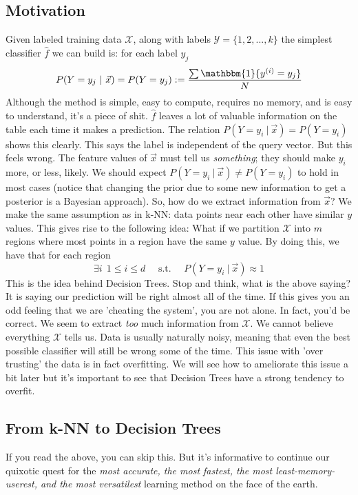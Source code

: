\documentclass[10pt]{article}
\begin{document}
	\subsection*{Motivation}
		Given labeled training data $\mathcal{X}$, along with labels $\mathcal{Y} = \{1, 2, ... , k\} $ 
		the simplest classifier $\hat f$ we can build is: for each label $y_j$  
		$$P(Y=y_j \ | \ \vec x) = P(Y=y_j) :=  \frac{ \sum\mathbbm{1} \{y^{(i)} = y_j \} }{N}  $$ 
		Although the method is simple, easy to compute, requires no memory, and is easy to understand, it's a piece of shit. 
		$\hat f$ leaves  a lot of valuable information on the table each time it makes a prediction. The relation 
		$P(Y=y_i \ | \ \vec x) = P(Y=y_i)$ shows this clearly. This says the label is independent of the query vector.
		But this feels wrong. The feature values of $\vec x$ must tell us \textit{something};
		they should make $y_i$ more, or less, likely. We should expect $P(Y=y_i \ | \ \vec x) \not = P(Y=y_i)$ to 
		hold in most cases (notice that changing the prior due to some new information to get a posterior is a
		Bayesian approach). So, how do we extract information from $\vec x$? We make the same assumption as in 
		k-NN: data points near each other have similar $y$ values. This gives rise to the following idea:
		What if we partition $\mathcal{X}$ into $m$ regions where most points in a region have the same $y$ value. 
		By doing this, we have that for each region
		$$\exists i \ \ 1 \leq i \leq d \quad \textrm{ s.t. } \quad P(Y = y_i \ | \ \vec x) \approx 1 $$ 
		This is the idea behind Decision Trees. Stop and think, what is the above saying? It is saying our prediction
		will be right almost all of the time. If this gives you an odd feeling that we are 'cheating the system', 
		you are not alone. In fact, you'd be correct. We seem to extract \textit{too} much information from 
		$\mathcal{X}$. We cannot believe everything $\mathcal X$ tells us. Data is usually naturally noisy, 
		meaning that even the best possible classifier will still be wrong some of the time. This issue with 
		'over trusting' the data is in fact overfitting. We will see how to ameliorate this issue a bit later but it's 
		important to see that Decision Trees have a strong tendency to overfit. 

	
	\subsection*{From k-NN to Decision Trees}
		If you read the above, you can skip this. But it's informative to continue our quixotic quest for the 
		\textit{most accurate, the most fastest, the most least-memory-userest, and the most versatilest} 
		learning method on the face of the earth. \\
		
\end{document}
